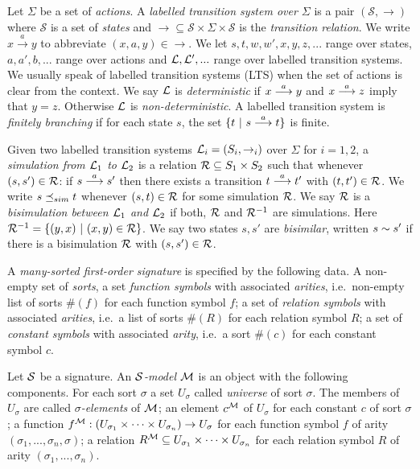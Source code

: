 Let $\Sigma$ be a set of \emph{actions}.  A \emph{labelled transition
  system over $\Sigma$} is a pair $(\mathcal{S}, \rightarrow)$ where
$\mathcal{S}$ is a set of \emph{states} and $\rightarrow \subseteq
\mathcal{S} \times \Sigma \times \mathcal{S}$ is the \emph{transition
  relation}.  We write $x \xrightarrow{a} y$ to abbreviate $(x,a,y)
\in \rightarrow$. We let $s, t, w, w', x, y, z, ...$ range over
states, $a, a', b, ...$ range over actions and $\mathcal{L}, \mathcal{L}', ...$
range over labelled transition systems. We usually speak of labelled
transition systems (LTS) when the set of actions is clear from the
context.  We say $\mathcal{L}$ is \emph{deterministic} if $x \stackrel{a}{\longrightarrow} y$ and
$x \stackrel{a}{\longrightarrow} z$ imply that $y = z$. Otherwise $\mathcal{L}$ is
\emph{non-deterministic}.  A labelled transition system is
\emph{finitely branching} if for each state $s$, the set $\{t\ |\ s
\stackrel{a}{\longrightarrow} t\}$ is finite.

Given two labelled transition systems $\mathcal{L}_i = (S_i, \rightarrow_i)$
over $\Sigma$ for $i = 1, 2$, a \emph{simulation from $\mathcal{L}_1$ to
  $\mathcal{L}_2$} is a relation $\mathcal{R} \subseteq S_1 \times S_2$ such that
whenever $(s, s') \in \mathcal{R}$: if $s \stackrel{a}{\longrightarrow} s'$ then there exists a
transition $t \stackrel{a}{\longrightarrow} t'$ with $(t, t') \in \mathcal{R}$.  We write $s \preceq_{sim}
t$ whenever $(s, t) \in \mathcal{R}$ for some simulation $\mathcal{R}$.  We say
$\mathcal{R}$ is a \emph{bisimulation between $\mathcal{L}_1$ and $\mathcal{L}_2$} if both,
$\mathcal{R}$ and $\mathcal{R}^{-1}$ are simulations. Here $\mathcal{R}^{-1} = \{(y,
x)\ |\ (x, y) \in \mathcal{R}\}$.  We say two states $s, s'$ are
\emph{bisimilar}, written $s \sim s'$ if there is a bisimulation
$\mathcal{R}$ with $(s, s') \in \mathcal{R}$.

A \emph{many-sorted first-order signature} is specified by the
following data.  A non-empty set of \emph{sorts}, a set \emph{function
  symbols} with associated \emph{arities}, i.e.~non-empty list of
sorts $\#(f)$ for each function symbol $f$; a set of \emph{relation
  symbols} with associated \emph{arities}, i.e.~a list of sorts
$\#(R)$ for each relation symbol $R$; a set of \emph{constant symbols}
with associated \emph{arity}, i.e.~a sort $\#(c)$ for each constant
symbol $c$.

Let $\mathcal{S}$ be a signature. An \emph{$\mathcal{S}$-model} $\mathcal{M}$ is an
object with the following components.  For each sort $\sigma$ a set
$U_{\sigma}$ called \emph{universe} of sort $\sigma$.  The members of
$U_{\sigma}$ are called \emph{$\sigma$-elements} of $\mathcal{M}$; an
element $c^{\mathcal{M}}$ of $U_{\sigma}$ for each constant $c$ of sort
$\sigma$; a function $f^{\mathcal{M}} : (U_{\sigma_1}\times \dots \times
U_{\sigma_n}) \rightarrow U_{\sigma}$ for each function symbol $f$ of
arity $(\sigma_1, ..., \sigma_n, \sigma)$; a relation $R^{\mathcal{M}}
\subseteq U_{\sigma_1}\times \dots \times U_{\sigma_n}$ for each
relation symbol $R$ of arity $(\sigma_1, ..., \sigma_n)$.

